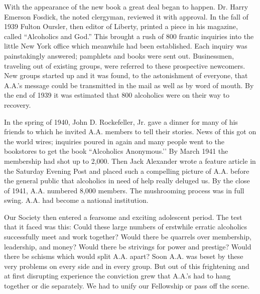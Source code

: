 \begin{biblechapter}
    With the appearance of the new book a great deal began to happen. 
\verse Dr. Harry Emerson Fosdick, 
    the noted clergyman, 
    reviewed it with approval. 
\verse In the fall of 1939 Fulton Oursler, 
    then editor of Liberty, 
    printed a piece in his magazine, 
    called “Alcoholics and God.” 
\verse This brought a rush of 800 frantic inquiries 
    into the little New York office 
    which meanwhile had been established. 
\verse Each inquiry was painstakingly answered; 
    pamphlets and books were sent out. 
\verse Businessmen, traveling out of existing groups, 
    were referred to these prospective newcomers. 
\verse New groups started up and it was found, 
    to the astonishment of everyone, 
    that A.A.’s message could be transmitted in the mail 
    as well as by word of mouth. 
\verse By the end of 1939 it was estimated that 
    800 alcoholics were on their way to recovery.


    In the spring of 1940, John D. Rockefeller, Jr. 
    gave a dinner for many of his friends 
    to which he invited A.A. members to tell their stories. 
\verse News of this got on the world wires; 
    inquiries poured in again 
    and many people went to the bookstores to get the book 
    “Alcoholics Anonymous.’’ 
\verse By March 1941 the membership had shot up to 2,000. 
\verse Then Jack Alexander wrote a feature article 
    in the Saturday Evening Post 
    and placed such a compelling picture of A.A. before the general public 
    that alcoholics in need of help really deluged us. 
\verse By the close of 1941, A.A. numbered 8,000 members. 
\verse The mushrooming process was in full swing.
\verse A.A. had become a national institution.

    Our Society then entered a fearsome and exciting adolescent period. 
\verse The test that it faced was this:
\verse Could these large numbers of erstwhile erratic alcoholics 
    successfully meet and work together? 
\verse Would there be quarrels over membership, leadership, and money? 
\verse Would there be strivings for power and prestige? 
\verse Would there be schisms which would split A.A. apart? 
\verse Soon A.A. was beset by these very problems on every side 
    and in every group. 
\verse But out of this frightening and at first disrupting experience 
    the conviction grew that A.A.’s had to hang together or die separately.
\verse We had to unify our Fellowship or pass off the scene.


\end{biblechapter}
